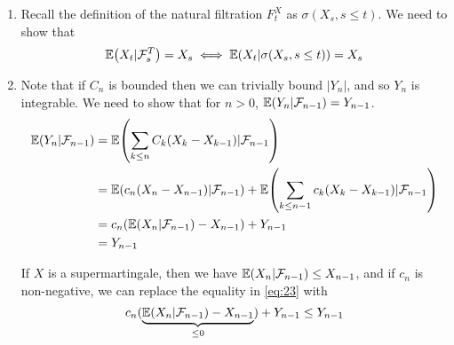 \begin{enumerate}
\item Recall the definition of the natural filtration $F_{t}^{X}$ as
  $\sigma(X_{s}, s \leq t)$.  We need to show that
  \begin{equation}
    \label{eq:20}
    \E{X_{t}|\mathcal{F}_{s}^{T}} = X_{s} \iff \E{X_{t} |
      \sigma(X_{s}, s \leq t)} = X_{s}
  \end{equation}

  
\item Note that if $C_{n}$ is bounded then we can trivially bound
  $|Y_{n}|$, and so $Y_{n}$ is integrable.  We need to show that for
  $n > 0$, $\E{Y_{n} | \mathcal{F}_{n-1}} = Y_{n-1}$. 
  \begin{align}
    \label{eq:21}
    \E{Y_{n} | \mathcal{F}_{n-1}} &= \E{\sum_{k \leq n} C_{k} (X_{k} -
      X_{k-1}) | \mathcal{F}_{n-1}} \\
    &= \E{c_{n}(X_{n} - X_{n-1}) | \mathcal{F}_{n-1}} + \E{\sum_{k \leq
        n-1} c_{k} (X_{k} - X_{k-1}) | \mathcal{F}_{n-1}} \\
    &= c_{n} (\E{X_{n} | \mathcal{F}_{n-1}} - X_{n-1}) + Y_{n-1} \\
    \label{eq:23}
    &= Y_{n-1}
  \end{align}

  If $X$ is a supermartingale, then we have
  $\E{X_{n} | \mathcal{F}_{n-1}} \leq X_{n-1}$, and if $c_{n}$ is
  non-negative, we can replace the equality in \eqref{eq:23} with
  \begin{equation}
    \label{eq:24}
    c_{n}(\underbrace{\E{X_{n} | \mathcal{F}_{n-1}} - X_{n-1}}_{\leq 0}) + Y_{n-1} \leq Y_{n-1}
  \end{equation}
\end{enumerate}



